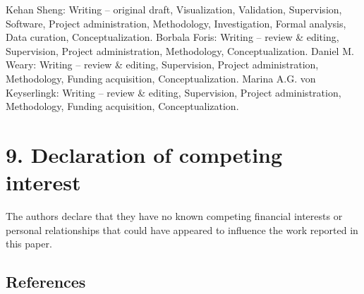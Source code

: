 \documentclass[
]{article}
\begin{document}
Kehan Sheng: Writing -- original draft, Visualization, Validation,
Supervision, Software, Project administration, Methodology,
Investigation, Formal analysis, Data curation, Conceptualization.
Borbala Foris: Writing -- review \& editing, Supervision, Project
administration, Methodology, Conceptualization. Daniel M. Weary: Writing
-- review \& editing, Supervision, Project administration, Methodology,
Funding acquisition, Conceptualization. Marina A.G. von Keyserlingk:
Writing -- review \& editing, Supervision, Project administration,
Methodology, Funding acquisition, Conceptualization.

\section{9. Declaration of competing
interest}\label{declaration-of-competing-interest}

The authors declare that they have no known competing financial
interests or personal relationships that could have appeared to
influence the work reported in this paper.

\subsection{References}\label{references}
\end{document}
